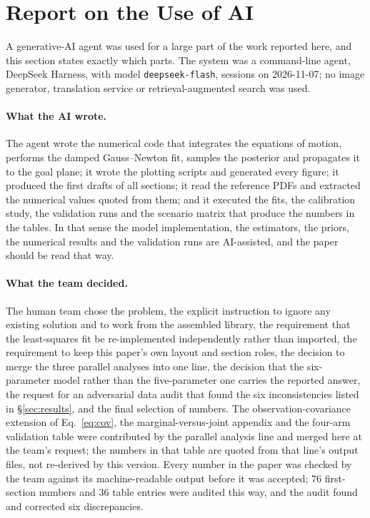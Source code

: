 \section{Report on the Use of AI}
\label{sec:ai}

A generative-AI agent was used for a large part of the work reported here, and
this section states exactly which parts. The system was a command-line agent,
DeepSeek Harness, with model \texttt{deepseek-flash}, sessions on 2026-11-07; no
image generator, translation service or retrieval-augmented search was used.

\paragraph{What the AI wrote.} The agent wrote the numerical code that integrates
the equations of motion, performs the damped Gauss--Newton fit, samples the
posterior and propagates it to the goal plane; it wrote the plotting scripts and
generated every figure; it produced the first drafts of all sections; it read the
reference PDFs and extracted the numerical values quoted from them; and it
executed the fits, the calibration study, the validation runs and the scenario
matrix that produce the numbers in the tables. In that sense the model
implementation, the estimators, the priors, the numerical results and the
validation runs are AI-assisted, and the paper should be read that way.

\paragraph{What the team decided.} The human team chose the problem, the
explicit instruction to ignore any existing solution and to work from the
assembled library, the requirement that the least-squares fit be re-implemented
independently rather than imported, the requirement to keep this paper's own
layout and section roles, the decision to merge the three parallel analyses into
one line, the decision that the six-parameter model rather than the five-parameter
one carries the reported answer, the request for an adversarial data audit that
found the six inconsistencies listed in \S\ref{sec:results}, and the final
selection of numbers. The observation-covariance extension of
Eq.~\eqref{eq:cov}, the marginal-versus-joint appendix and the four-arm
validation table were contributed by the parallel analysis line and merged here at
the team's request; the numbers in that table are quoted from that line's output
files, not re-derived by this version. Every number in the paper was checked by the team against
its machine-readable output before it was accepted; 76 first-section numbers and
36 table entries were audited this way, and the audit found and corrected six
discrepancies.

